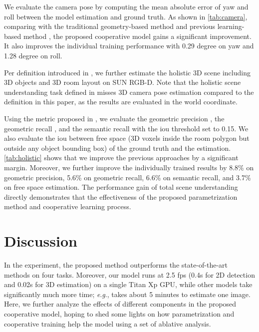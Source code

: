 \documentclass{article}
\makeatletter
\newcommand{\eg}{\textit{e}.\textit{g}.\@\xspace}
\renewcommand{\paragraph}{\@startsection{paragraph}{4}{\z@}{0ex \@plus 0ex \@minus 0ex}{-1em}{\hskip\parindent\normalfont\normalsize\bfseries}}
\makeatother
\begin{document}
We evaluate the camera pose by computing the mean absolute error of yaw and roll between the model estimation and ground truth. As shown in \autoref{tab:camera}, comparing with the traditional geometry-based method \citep{hedau2009recovering} and previous learning-based method \citep{huang2018holistic}, the proposed cooperative model gains a significant improvement. It also improves the individual training performance with 0.29 degree on yaw and 1.28 degree on roll.

\paragraph{Holistic Scene Understanding}

Per definition introduced in \citep{song2015sun}, we further estimate the holistic 3D scene including 3D objects and 3D room layout on SUN RGB-D. Note that the holistic scene understanding task defined in \citep{song2015sun} misses 3D camera pose estimation compared to the definition in this paper, as the results are evaluated in the world coordinate.

Using the metric proposed in \citep{song2015sun}, we evaluate the geometric precision , the geometric recall , and the semantic recall  with the \ac{iou} threshold set to 0.15. We also evaluate the \ac{iou} between free space (3D voxels inside the room polygon but outside any object bounding box) of the ground truth and the estimation. \autoref{tab:holistic} shows that we improve the previous approaches by a significant margin. Moreover, we further improve the individually trained results by 8.8\% on geometric precision, 5.6\% on geometric recall, 6.6\% on semantic recall, and 3.7\% on free space estimation. The performance gain of total scene understanding directly demonstrates that the effectiveness of the proposed parametrization method and cooperative learning process.

\section{Discussion}

In the experiment, the proposed method outperforms the state-of-the-art methods on four tasks. Moreover, our model runs at 2.5 fps (0.4s for 2D detection and 0.02s for 3D estimation) on a single Titan Xp GPU, while other models take significantly much more time; \eg, \citep{izadinia2016im2cad} takes about 5 minutes to estimate one image. Here, we further analyze the effects of different components in the proposed cooperative model, hoping to shed some lights on how parametrization and cooperative training help the model using a set of ablative analysis.
\end{document}
